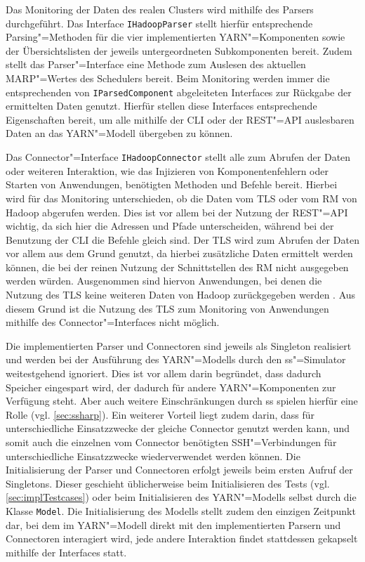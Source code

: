 Das Monitoring der Daten des realen Clusters wird mithilfe des Parsers durchgeführt.
Das Interface \texttt{IHadoopParser} stellt hierfür entsprechende Parsing"=Methoden für die vier implementierten YARN"=Komponenten sowie der Übersichtslisten der jeweils untergeordneten Subkomponenten bereit.
Zudem stellt das Parser"=Interface eine Methode zum Auslesen des aktuellen \gls{MARP}"=Wertes des Schedulers bereit.
Beim Monitoring werden immer die entsprechenden von \texttt{IParsedComponent} abgeleiteten Interfaces zur Rückgabe der ermittelten Daten genutzt.
Hierfür stellen diese Interfaces entsprechende Eigenschaften bereit, um alle mithilfe der \gls{CLI} oder der REST"=API auslesbaren Daten an das YARN"=Modell übergeben zu können.

Das Connector"=Interface \texttt{IHadoopConnector} stellt alle zum Abrufen der Daten oder weiteren Interaktion, wie das Injizieren von Komponentenfehlern oder Starten von Anwendungen, benötigten Methoden und Befehle bereit.
Hierbei wird für das Monitoring unterschieden, ob die Daten vom \gls{TLS} oder vom \gls{RM} von Hadoop abgerufen werden.
Dies ist vor allem bei der Nutzung der REST"=API wichtig, da sich hier die Adressen und Pfade unterscheiden, während bei der Benutzung der \gls{CLI} die Befehle gleich sind.
Der \gls{TLS} wird zum Abrufen der Daten vor allem aus dem Grund genutzt, da hierbei zusätzliche Daten ermittelt werden können, die bei der reinen Nutzung der Schnittstellen des \gls{RM} nicht ausgegeben werden würden.
Ausgenommen sind hiervon Anwendungen, bei denen die Nutzung des \gls{TLS} keine weiteren Daten von Hadoop zurückgegeben werden \cite{HadoopYarnTlServer271,HadoopYarnCmds271,HadoopRmApi271,HadoopNmApi271}.
Aus diesem Grund ist die Nutzung des \gls{TLS} zum Monitoring von Anwendungen mithilfe des Connector"=Interfaces nicht möglich.

Die implementierten Parser und Connectoren sind jeweils als Singleton realisiert und werden bei der Ausführung des YARN"=Modells durch den \gls{ss}"=Simulator weitestgehend ignoriert.
Dies ist vor allem darin begründet, dass dadurch Speicher eingespart wird, der dadurch für andere YARN"=Komponenten zur Verfügung steht.
Aber auch weitere Einschränkungen durch \gls{ss} spielen hierfür eine Rolle (vgl. \cref{sec:ssharp}).
Ein weiterer Vorteil liegt zudem darin, dass für unterschiedliche Einsatzzwecke der gleiche Connector genutzt werden kann, und somit auch die einzelnen vom Connector benötigten SSH"=Verbindungen für unterschiedliche Einsatzzwecke wiederverwendet werden können.
Die Initialisierung der Parser und Connectoren erfolgt jeweils beim ersten Aufruf der Singletons.
Dieser geschieht üblicherweise beim Initialisieren des Tests (vgl. \cref{sec:implTestcases}) oder beim Initialisieren des YARN"=Modells selbst durch die Klasse \texttt{Model}.
Die Initialisierung des Modells stellt zudem den einzigen Zeitpunkt dar, bei dem im YARN"=Modell direkt mit den implementierten Parsern und Connectoren interagiert wird, jede andere Interaktion findet stattdessen gekapselt mithilfe der Interfaces statt.

